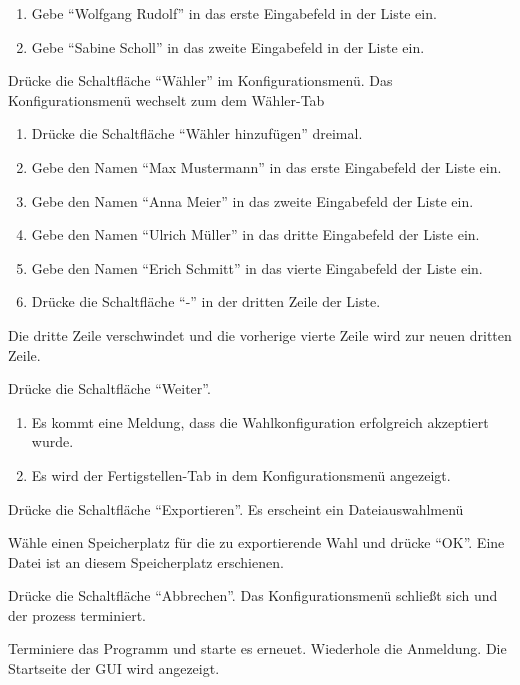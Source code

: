 \documentclass[parskip=full]{scrartcl}
\begin{document}
\teststep{}
		{\begin{enumerate}
			\item Gebe \enquote{Wolfgang Rudolf} in das erste Eingabefeld in der Liste ein.
			\item Gebe \enquote{Sabine Scholl} in das zweite Eingabefeld in der Liste ein.
		\end{enumerate}}
		{}

\teststep{}
		{Drücke die Schaltfläche \enquote{Wähler} im Konfigurationsmenü.}
		{Das Konfigurationsmenü wechselt zum dem Wähler-Tab}

\teststep{}
		{\begin{enumerate}
				\item Drücke die Schaltfläche \enquote{Wähler hinzufügen} dreimal.
				\item Gebe den Namen \enquote{Max Mustermann} in das erste Eingabefeld der Liste ein.
				\item Gebe den Namen \enquote{Anna Meier} in das zweite Eingabefeld der Liste ein.
				\item Gebe den Namen \enquote{Ulrich Müller} in das dritte Eingabefeld der Liste ein.
				\item Gebe den Namen \enquote{Erich Schmitt} in das vierte Eingabefeld der Liste ein.
				\item Drücke die Schaltfläche \enquote{-} in der dritten Zeile der Liste.
		\end{enumerate}}
		{Die dritte Zeile verschwindet und die vorherige vierte Zeile wird zur neuen dritten Zeile.}

\teststep{}
		{Drücke die Schaltfläche \enquote{Weiter}.}
		{\begin{enumerate}
				\item Es kommt eine Meldung, dass die Wahlkonfiguration erfolgreich akzeptiert wurde.
				\item Es wird der Fertigstellen-Tab in dem Konfigurationsmenü angezeigt.
		\end{enumerate}}

\teststep{}
		{Drücke die Schaltfläche \enquote{Exportieren}.}
		{Es erscheint ein Dateiauswahlmenü}

\teststep{}
		{Wähle einen Speicherplatz für die zu exportierende Wahl und drücke \enquote{OK}.}
		{Eine Datei ist an diesem Speicherplatz erschienen.}

\teststep{}
		{Drücke die Schaltfläche \enquote{Abbrechen}.}
		{Das Konfigurationsmenü schließt sich und der prozess terminiert.}

\teststep{}
		{Terminiere das Programm und starte es erneuet. Wiederhole die Anmeldung.}
		{Die Startseite der GUI wird angezeigt.}
\end{document}
